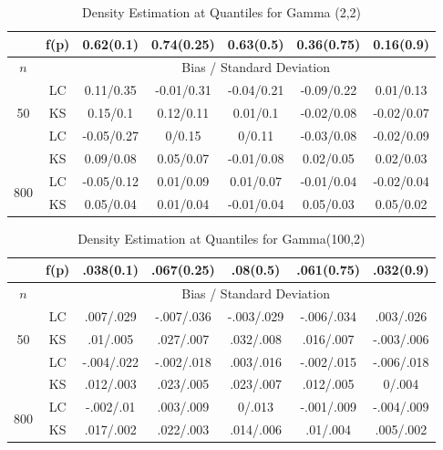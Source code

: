 \documentclass[10pt]{article}
\begin{document}
	
\begin{center}	
	
\begin{table}[H]

\caption{Density Estimation at Quantiles for Gamma (2,2) }
	
\begin{tabular} {| c | c | c | c | c | c | c | } 

	 \hline
		&f(p)&	0.62(0.1)&	0.74(0.25)&	0.63(0.5)&	0.36(0.75)&	0.16(0.9)\\ 
 \hline 
 	$n$ & & \multicolumn{5}{|c|}{Bias / Standard Deviation} 
 \\ 
 \hline 
\multirow{3}{*}{50}		&	LC	&0.11/0.35	&-0.01/0.31	&-0.04/0.21	&-0.09/0.22	&0.01/0.13\\ 
			&	KS	&0.15/0.1	&0.12/0.11	&0.01/0.1	&-0.02/0.08	&-0.02/0.07\\ 
	\hline 
\multirow{3}{*}{200}		&	LC	&-0.05/0.27	&0/0.15	&0/0.11	&-0.03/0.08	&-0.02/0.09\\ 
			&	KS	&0.09/0.08	&0.05/0.07	&-0.01/0.08	&0.02/0.05	&0.02/0.03\\ 
	\hline 
\multirow{3}{*}{800}		&	LC	&-0.05/0.12	&0.01/0.09	&0.01/0.07	&-0.01/0.04	&-0.02/0.04\\ 
			&	KS	&0.05/0.04	&0.01/0.04	&-0.01/0.04	&0.05/0.03	&0.05/0.02\\ 
	\hline 

\end{tabular}
	
\end{table}	
	
	
\begin{table}[H]

\caption{Density Estimation at Quantiles for Gamma(100,2)}

\begin{tabular} {| c | c | c | c | c | c | c | } 

	 \hline
		&f(p)&	.038(0.1)&	.067(0.25)&	.08(0.5)&	.061(0.75)&	.032(0.9)\\ 
 \hline 
 	$n$ & & \multicolumn{5}{|c|}{Bias / Standard Deviation} 
 \\ 
 \hline 
\multirow{3}{*}{50}		&	LC	&.007/.029	&-.007/.036	&-.003/.029	&-.006/.034	&.003/.026\\ 
			&	KS	&.01/.005	&.027/.007	&.032/.008	&.016/.007	&-.003/.006\\ 
	\hline 
\multirow{3}{*}{200}		&	LC	&-.004/.022	&-.002/.018	&.003/.016	&-.002/.015	&-.006/.018\\ 
			&	KS	&.012/.003	&.023/.005	&.023/.007	&.012/.005	&0/.004\\ 
	\hline 
\multirow{3}{*}{800}		&	LC	&-.002/.01	&.003/.009	&0/.013	&-.001/.009	&-.004/.009\\ 
			&	KS	&.017/.002	&.022/.003	&.014/.006	&.01/.004	&.005/.002\\ 
	\hline 


\end{tabular}
\end{table}
\end{center}
\end{document}
